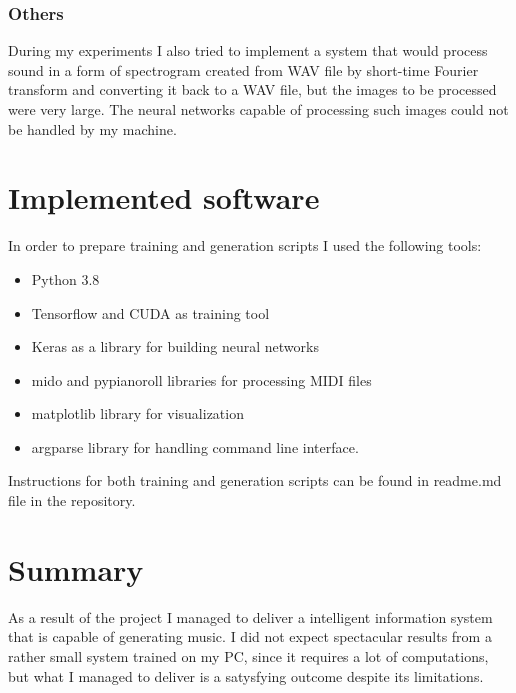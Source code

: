 \documentclass[]{article}
\begin{document}
\subsubsection{Others}

During my experiments I also tried to implement a system that would process sound in a form of spectrogram created from WAV file by short-time Fourier transform and converting it back to a WAV file, but the images to be processed were very large. The neural networks capable of processing such images could not be handled by my machine.

\clearpage

\section{Implemented software}

In order to prepare training and generation scripts I used the following tools:

\begin{itemize}
	\item Python 3.8
	\item Tensorflow and CUDA as training tool
	\item Keras as a library for building neural networks
	\item mido and pypianoroll libraries for processing MIDI files
	\item matplotlib library for visualization
	\item argparse library for handling command line interface.
\end{itemize}

Instructions for both training and generation scripts can be found in readme.md file in the repository.

\section{Summary}

As a result of the project I managed to deliver a intelligent information system that is capable of generating music. I did not expect spectacular results from a rather small system trained on my PC, since it requires a lot of computations, but what I managed to deliver is a satysfying outcome despite its limitations.



\end{document}
